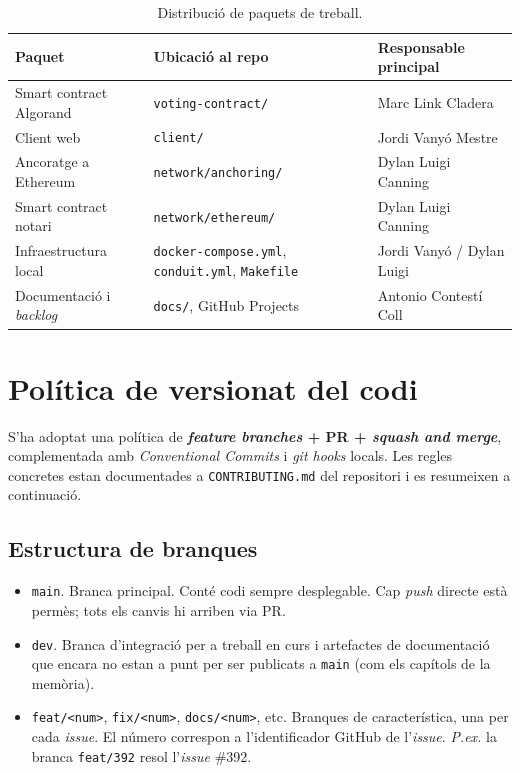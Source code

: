 \begin{table}[ht]
\centering
\small
\begin{tabular}{@{}p{3cm}p{4.2cm}p{4.5cm}@{}}
\toprule
\textbf{Paquet} & \textbf{Ubicació al repo} & \textbf{Responsable principal} \\
\midrule
Smart contract Algorand    & \texttt{voting-contract/}     & Marc Link Cladera \\
Client web                 & \texttt{client/}              & Jordi Vanyó Mestre \\
Ancoratge a Ethereum       & \texttt{network/anchoring/}   & Dylan Luigi Canning \\
Smart contract notari      & \texttt{network/ethereum/}    & Dylan Luigi Canning \\
Infraestructura local      & \texttt{docker-compose.yml}, \texttt{conduit.yml}, \texttt{Makefile} & Jordi Vanyó / Dylan Luigi \\
Documentació i \emph{backlog} & \texttt{docs/}, GitHub Projects & Antonio Contestí Coll \\
\bottomrule
\end{tabular}
\caption{Distribució de paquets de treball.}
\label{tab:paquets}
\end{table}

\section{Política de versionat del codi}
\label{sec:versionat}

S'ha adoptat una política de \textbf{\emph{feature branches} + \ac{PR} +
\emph{squash and merge}}, complementada amb \emph{Conventional Commits}
\cite{conventionalcommits} i \emph{git hooks} locals. Les regles concretes
estan documentades a \texttt{CONTRIBUTING.md} del repositori i es resumeixen
a continuació.

\subsection{Estructura de branques}

\begin{itemize}
    \item \texttt{main}. Branca principal. Conté codi sempre desplegable. Cap
    \emph{push} directe està permès; tots els canvis hi arriben via \ac{PR}.

    \item \texttt{dev}. Branca d'integració per a treball en curs i artefactes
    de documentació que encara no estan a punt per ser publicats a
    \texttt{main} (com els capítols de la memòria).

    \item \texttt{feat/<num>}, \texttt{fix/<num>}, \texttt{docs/<num>}, etc.
    Branques de característica, una per cada \emph{issue}. El número
    correspon a l'identificador GitHub de l'\emph{issue}. \emph{P.ex.} la
    branca \texttt{feat/392} resol l'\emph{issue} \#392.
\end{itemize}

